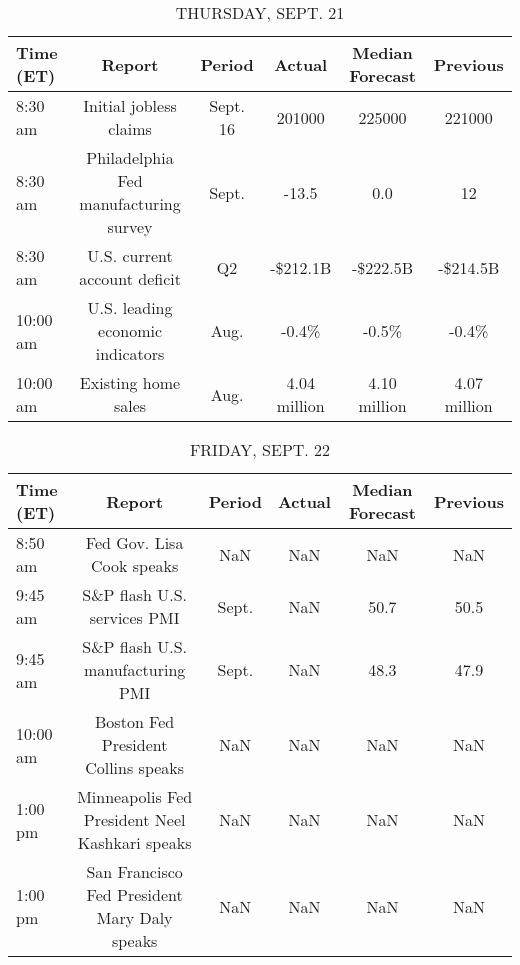 \documentclass{article}%
\begin{document}
%


\begin{table}[htbp]%
\caption{THURSDAY, SEPT. 21}%
\centering%
\begin{adjustbox}{width=1\textwidth}%
\begin{tabular}{lccccc}
\toprule
Time (ET) &                                Report &   Period &       Actual & Median Forecast &     Previous \\
\midrule
  8:30 am &                Initial jobless claims & Sept. 16 &       201000 &          225000 &       221000 \\
  8:30 am & Philadelphia Fed manufacturing survey &    Sept. &        -13.5 &             0.0 &           12 \\
  8:30 am &          U.S. current account deficit &       Q2 &     -\$212.1B &        -\$222.5B &     -\$214.5B \\
 10:00 am &      U.S. leading economic indicators &     Aug. &        -0.4\% &           -0.5\% &        -0.4\% \\
 10:00 am &                   Existing home sales &     Aug. & 4.04 million &    4.10 million & 4.07 million \\
\bottomrule
\end{tabular}
%
\end{adjustbox}%
\end{table}

%


\begin{table}[htbp]%
\caption{FRIDAY, SEPT. 22}%
\centering%
\begin{adjustbox}{width=1\textwidth}%
\begin{tabular}{lccccc}
\toprule
Time (ET) &                                         Report & Period & Actual & Median Forecast & Previous \\
\midrule
  8:50 am &                      Fed Gov. Lisa Cook speaks &    NaN &    NaN &             NaN &      NaN \\
  9:45 am &                    S\&P flash U.S. services PMI &  Sept. &    NaN &            50.7 &     50.5 \\
  9:45 am &               S\&P flash U.S. manufacturing PMI &  Sept. &    NaN &            48.3 &     47.9 \\
 10:00 am &            Boston Fed President Collins speaks &    NaN &    NaN &             NaN &      NaN \\
  1:00 pm & Minneapolis Fed President Neel Kashkari speaks &    NaN &    NaN &             NaN &      NaN \\
  1:00 pm &   San Francisco Fed President Mary Daly speaks &    NaN &    NaN &             NaN &      NaN \\
\bottomrule
\end{tabular}
%
\end{adjustbox}%
\end{table}
\end{document}
